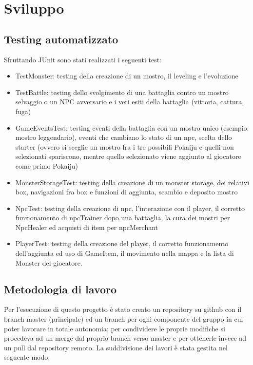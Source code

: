 \chapter{Sviluppo}
\section{Testing automatizzato}

Sfruttando JUnit sono stati realizzati i seguenti test:
\begin{itemize}
    \item TestMonster: testing della creazione di un mostro, il leveling e l'evoluzione
    \item TestBattle: testing dello svolgimento di una battaglia contro un mostro selvaggio o un NPC avversario e i veri esiti della battaglia (vittoria, cattura, fuga)
    \item GameEventsTest: testing eventi della battaglia con un mostro unico (esempio: mostro leggendario), eventi che cambiano lo stato di un npc, scelta dello starter (ovvero si sceglie un mostro fra i tre possibili Pokaiju e quelli non selezionati spariscono, mentre quello selezionato viene aggiunto al giocatore come primo Pokaiju)  
    \item MonsterStorageTest: testing della creazione di un monster storage, dei relativi box, navigazioni fra box e funzioni di aggiunta, scambio e deposito mostro
    \item NpcTest: testing della creazione di npc, l'interazione con il player, il corretto funzionamento di npcTrainer dopo una battaglia, la cura dei mostri per NpcHealer ed acquisti di item per npcMerchant 
     \item PlayerTest: testing della creazione del player, il corretto funzionamento  dell'aggiunta ed uso di GameItem, il movimento nella mappa e la lista di Monster del giocatore.
\end{itemize}

\section{Metodologia di lavoro}

Per l'esecuzione di questo progetto è stato creato un repository su github con il branch master (principale) ed un branch per ogni componente del gruppo in cui poter lavorare in totale autonomia; per condividere le proprie modifiche si procedeva ad un merge dal proprio branch verso master e per ottenerle invece ad un pull dal repository remoto.
\newline
La suddivisione dei lavori è stata gestita nel seguente modo:

